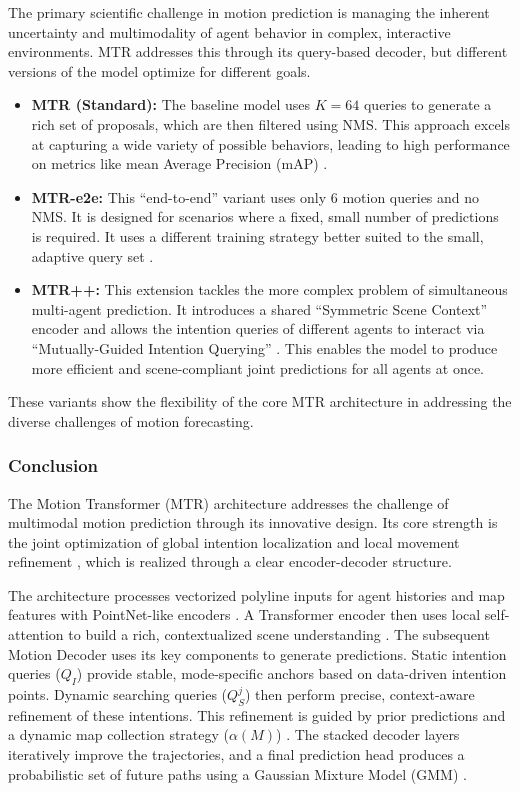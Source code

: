 The primary scientific challenge in motion prediction is managing the inherent uncertainty and multimodality of agent behavior in complex, interactive environments. MTR addresses this through its query-based decoder, but different versions of the model optimize for different goals.

\begin{itemize}
    \item \textbf{MTR (Standard):} The baseline model uses $K=64$ queries to generate a rich set of proposals, which are then filtered using NMS. This approach excels at capturing a wide variety of possible behaviors, leading to high performance on metrics like mean Average Precision (mAP) \cite{Shi2022MTR}.
    \item \textbf{MTR-e2e:} This ``end-to-end'' variant uses only 6 motion queries and no NMS. It is designed for scenarios where a fixed, small number of predictions is required. It uses a different training strategy better suited to the small, adaptive query set \cite{Shi2022MTR}.
    \item \textbf{MTR++:} This extension tackles the more complex problem of simultaneous multi-agent prediction. It introduces a shared ``Symmetric Scene Context'' encoder and allows the intention queries of different agents to interact via ``Mutually-Guided Intention Querying'' \cite{Shi2023MTRplusplus}. This enables the model to produce more efficient and scene-compliant joint predictions for all agents at once.
\end{itemize}

These variants show the flexibility of the core MTR architecture in addressing the diverse challenges of motion forecasting.

\subsubsection{Conclusion}
\label{sec:conclusion}

The Motion Transformer (MTR) architecture addresses the challenge of multimodal motion prediction through its innovative design. Its core strength is the joint optimization of global intention localization and local movement refinement \cite{Shi2022MTR}, which is realized through a clear encoder-decoder structure.

The architecture processes vectorized polyline inputs for agent histories and map features with PointNet-like encoders \cite{gao2020vectornet, PointNet2017}. A Transformer encoder then uses local self-attention to build a rich, contextualized scene understanding \cite{Shi2022MTR}. The subsequent Motion Decoder uses its key components to generate predictions. Static intention queries ($Q_I$) provide stable, mode-specific anchors based on data-driven intention points. Dynamic searching queries ($Q_S^j$) then perform precise, context-aware refinement of these intentions. This refinement is guided by prior predictions and a dynamic map collection strategy ($\alpha(M)$) \cite{Shi2022MTR}. The stacked decoder layers iteratively improve the trajectories, and a final prediction head produces a probabilistic set of future paths using a Gaussian Mixture Model (GMM) \cite{Bishop1994MDN}.


